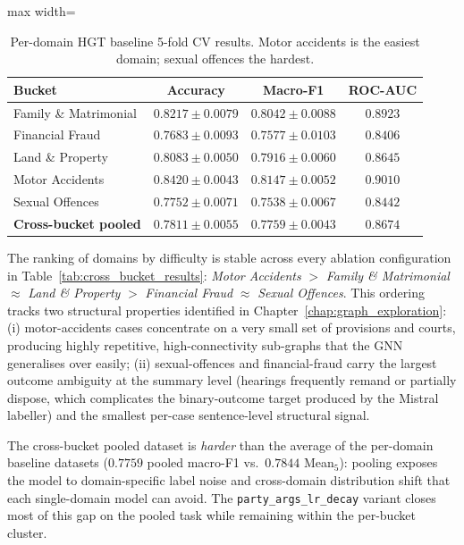\begin{table}[H]
  \centering
  \small
  \begin{adjustbox}{max width=\textwidth}
  \begin{tabular}{lccc}
    \toprule
    Bucket & Accuracy & Macro-F1 & ROC-AUC \\
    \midrule
    Family \& Matrimonial & $0.8217\pm0.0079$ & $0.8042\pm0.0088$ & $0.8923$ \\
    Financial Fraud      & $0.7683\pm0.0093$ & $0.7577\pm0.0103$ & $0.8406$ \\
    Land \& Property     & $0.8083\pm0.0050$ & $0.7916\pm0.0060$ & $0.8645$ \\
    Motor Accidents      & $0.8420\pm0.0043$ & $0.8147\pm0.0052$ & $0.9010$ \\
    Sexual Offences      & $0.7752\pm0.0071$ & $0.7538\pm0.0067$ & $0.8442$ \\
    \midrule
    \textbf{Cross-bucket pooled} & $0.7811\pm0.0055$ & $0.7759\pm0.0043$ & $0.8674$ \\
    \bottomrule
  \end{tabular}
  \end{adjustbox}
  \caption{Per-domain HGT baseline 5-fold CV results. Motor accidents
  is the easiest domain; sexual offences the hardest.}
  \label{tab:per_domain}
\end{table}

The ranking of domains by difficulty is stable across every ablation
configuration in Table~\ref{tab:cross_bucket_results}:
\textit{Motor Accidents} $>$ \textit{Family \& Matrimonial}
$\approx$ \textit{Land \& Property} $>$ \textit{Financial Fraud}
$\approx$ \textit{Sexual Offences}. This ordering tracks two
structural properties identified in
Chapter~\ref{chap:graph_exploration}: (i) motor-accidents cases
concentrate on a very small set of provisions and courts, producing
highly repetitive, high-connectivity sub-graphs that the GNN
generalises over easily; (ii) sexual-offences and financial-fraud
carry the largest outcome ambiguity at the summary level (hearings
frequently remand or partially dispose, which complicates the
binary-outcome target produced by the Mistral labeller) and the
smallest per-case sentence-level structural signal.

The cross-bucket pooled dataset is \emph{harder} than the average of
the per-domain baseline datasets ($0.7759$ pooled macro-F1 vs.\
$0.7844$ Mean$_5$): pooling exposes the model to domain-specific
label noise and cross-domain distribution shift that each
single-domain model can avoid. The \texttt{party\_args\_lr\_decay}
variant closes most of this gap on the pooled task while remaining
within the per-bucket cluster.

